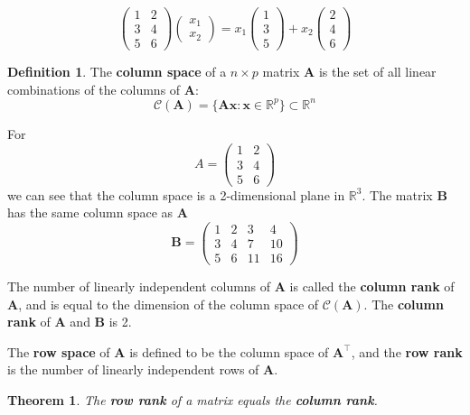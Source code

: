 \documentclass[
]{book}
\newtheorem{theorem}{Theorem}[chapter]
\theoremstyle{definition}
\newtheorem{definition}{Definition}[chapter]
\theoremstyle{definition}
\theoremstyle{definition}
\theoremstyle{definition}
\theoremstyle{remark}
\begin{document}
\[ \left( \begin{array}{cc} 1 & 2\\ 3&4\\5&6\end{array}\right) \left(\begin{array}{c}x_1\\ x_2\end{array}\right) = x_1\left(\begin{array}{c}1\\3\\5 \end{array}\right)+x_2\left(\begin{array}{c}2\\4\\6 \end{array}\right)\]

\begin{definition}
\protect\hypertarget{def:rank}{}{\label{def:rank} }The \textbf{column space} of a \(n\times p\) matrix \(\mathbf A\) is the set of all linear combinations of the columns of \(\mathbf A\):
\[\mathcal{C}(\mathbf A) = \{\mathbf A\mathbf x:  \mathbf x\in \mathbb{R}^p\}\subset \mathbb{R}^n\]
\end{definition}

For \[A=\left( \begin{array}{cc} 1 & 2\\ 3&4\\5&6\end{array}\right) \] we can see that the column space is a 2-dimensional plane in \(\mathbb{R}^3\). The matrix \(\mathbf B\) has the same column space as \(\mathbf A\)
\[\mathbf B=\left( \begin{array}{cccc} 1 & 2&3 &4\\ 3&4 &7&10\\5&6&11&16\end{array}\right) \]

The number of linearly independent columns of \(\mathbf A\) is called the \textbf{column rank} of \(\mathbf A\), and is equal to the dimension of the column space of \(\mathcal{C}(\mathbf A)\). The \textbf{column rank} of \(\mathbf A\) and \(\mathbf B\) is 2.

The \textbf{row space} of \(\mathbf A\) is defined to be the column space of \(\mathbf A^\top\), and the \textbf{row rank} is the number of linearly independent rows of \(\mathbf A\).

\begin{theorem}
\protect\hypertarget{thm:rowrank}{}{\label{thm:rowrank} }The \textbf{row rank} of a matrix equals the \textbf{column rank}.
\end{theorem}
\end{document}
